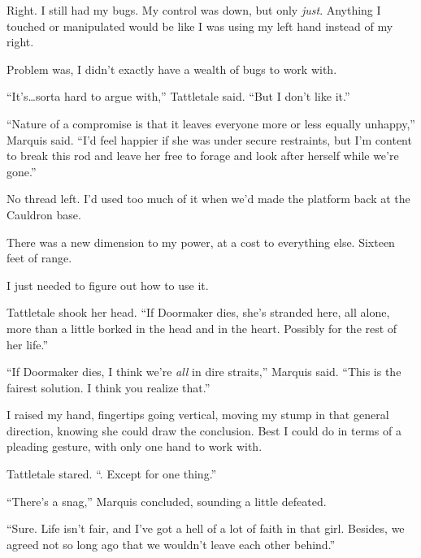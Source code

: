 Right.  I still had my bugs.  My control was down, but only \emph{just}.  Anything I touched or manipulated would be like I was using my left hand instead of my right.



Problem was, I didn't exactly have a wealth of bugs to work with.



``It's\ldots sorta hard to argue with,'' Tattletale said.  ``But I don't like it.''



``Nature of a compromise is that it leaves everyone more or less equally unhappy,'' Marquis said.  ``I'd feel happier if she was under secure restraints, but I'm content to break this rod and leave her free to forage and look after herself while we're gone.''



No thread left.  I'd used too much of it when we'd made the platform back at the Cauldron base.



There was a new dimension to my power, at a cost to everything else.  Sixteen feet of range.



I just needed to figure out how to use it.



Tattletale shook her head.  ``If Doormaker dies, she's stranded here, all alone, more than a little borked in the head and in the heart.  Possibly for the rest of her life.''



``If Doormaker dies, I think we're \emph{all} in dire straits,'' Marquis said.  ``This is the fairest solution.  I think you realize that.''



I raised my hand, fingertips going vertical, moving my stump in that general direction, knowing she could draw the conclusion.  Best I could do in terms of a pleading gesture, with only one hand to work with.



Tattletale stared.  ``\ldotsYeah.  Except for one thing.''



``There's a snag,'' Marquis concluded, sounding a little defeated.



``Sure.  Life isn't fair, and I've got a hell of a lot of faith in that girl.  Besides, we agreed not so long ago that we wouldn't leave each other behind.''



